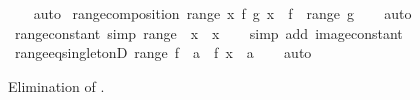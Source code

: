 \begin{isabellebody}
%
\isadelimproof
\ \ %
\endisadelimproof
%
\isatagproof
{}\isamarkupfalse%
\ auto%
\endisatagproof
{\isafoldproof}%
%
\isadelimproof
\isanewline
%
\endisadelimproof
\isanewline
{}\isamarkupfalse%
\ range{\isacharunderscore}{\kern0pt}composition{\isacharcolon}{\kern0pt}\ {\isachardoublequoteopen}range\ {\isacharparenleft}{\kern0pt}{\isasymlambda}x{\isachardot}{\kern0pt}\ f\ {\isacharparenleft}{\kern0pt}g\ x{\isacharparenright}{\kern0pt}{\isacharparenright}{\kern0pt}\ {\isacharequal}{\kern0pt}\ f\ {\isacharbackquote}{\kern0pt}\ range\ g{\isachardoublequoteclose}\isanewline
%
\isadelimproof
\ \ %
\endisadelimproof
%
\isatagproof
{}\isamarkupfalse%
\ auto%
\endisatagproof
{\isafoldproof}%
%
\isadelimproof
\isanewline
%
\endisadelimproof
\isanewline
{}\isamarkupfalse%
\ range{\isacharunderscore}{\kern0pt}constant\ {\isacharbrackleft}{\kern0pt}simp{\isacharbrackright}{\kern0pt}{\isacharcolon}{\kern0pt}\ {\isachardoublequoteopen}range\ {\isacharparenleft}{\kern0pt}{\isasymlambda}{\isacharunderscore}{\kern0pt}{\isachardot}{\kern0pt}\ x{\isacharparenright}{\kern0pt}\ {\isacharequal}{\kern0pt}\ {\isacharbraceleft}{\kern0pt}x{\isacharbraceright}{\kern0pt}{\isachardoublequoteclose}\isanewline
%
\isadelimproof
\ \ %
\endisadelimproof
%
\isatagproof
{}\isamarkupfalse%
\ {\isacharparenleft}{\kern0pt}simp\ add{\isacharcolon}{\kern0pt}\ image{\isacharunderscore}{\kern0pt}constant{\isacharparenright}{\kern0pt}%
\endisatagproof
{\isafoldproof}%
%
\isadelimproof
\isanewline
%
\endisadelimproof
\isanewline
{}\isamarkupfalse%
\ range{\isacharunderscore}{\kern0pt}eq{\isacharunderscore}{\kern0pt}singletonD{\isacharcolon}{\kern0pt}\ {\isachardoublequoteopen}range\ f\ {\isacharequal}{\kern0pt}\ {\isacharbraceleft}{\kern0pt}a{\isacharbraceright}{\kern0pt}\ {\isasymLongrightarrow}\ f\ x\ {\isacharequal}{\kern0pt}\ a{\isachardoublequoteclose}\isanewline
%
\isadelimproof
\ \ %
\endisadelimproof
%
\isatagproof
{}\isamarkupfalse%
\ auto%
\endisatagproof
{\isafoldproof}%
%
\isadelimproof
%
\endisadelimproof
%
\isadelimdocument
%
\endisadelimdocument
%
\isatagdocument
%
\isamarkuptrue%
%
\endisatagdocument
{\isafolddocument}%
%
\isadelimdocument
%
\endisadelimdocument
%
\begin{isamarkuptext}%
Elimination of .%
\end{isamarkuptext}\isamarkuptrue%

\end{isabellebody}
